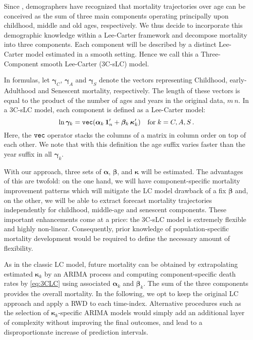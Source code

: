 \documentclass[Thesis]{subfiles}
\begin{document}
Since \citet{thiele1871mathematical}, demographers have recognized that mortality trajectories over age can be conceived as the sum of three main components operating principally upon childhood, middle and old ages, respectively. We thus decide to incorporate this demographic knowledge within a Lee-Carter framework and decompose mortality into three components. Each component will be described by a distinct Lee-Carter model estimated in a smooth setting. Hence we call this a Three-Component smooth Lee-Carter (3C-sLC) model. 

In formulas, let $\bm{\gamma}_{C}$, $\bm{\gamma}_{A}$ and $\bm{\gamma}_{S}$ denote the vectors representing Childhood, early-Adulthood and Senescent mortality, respectively. The length of these vectors is equal to the product of the number of ages and years in the original data, $m\,n$. 
In a 3C-sLC model, each component is defined as a Lee-Carter model:
\begin{equation}\label{eq:3CLC}
\ln \bm{\gamma}_{k} = \verb"vec"(\bm{\alpha}_{k}\,\bm{1}'_{n} +
\bm{\beta}_{k}\,\bm{\kappa}_{k}') \quad \mbox{for} \;k=C,A,S \, .
\end{equation}
Here, the $\verb"vec"$ operator stacks the columns of a matrix in column order on top of each other. We note that with this definition the age suffix varies faster than the year suffix in all $\bm{\gamma}_{k}$.

With our approach, three sets of $\bm{\alpha}$, $\bm{\beta}$, and $\bm{\kappa}$ will be estimated. The advantages of this are twofold: on the one hand, 
we will have component-specific mortality improvement patterns which will mitigate the LC model drawback of a fix $\bm{\beta}$ and, on the other, we will be able to extract forecast mortality trajectories independently for childhood, middle-age and senescent components. These important enhancements come at a price: the 3C-sLC model is extremely flexible and highly non-linear. Consequently, prior knowledge of population-specific mortality development would be required to define the necessary amount of flexibility. 

As in the classic LC model, future mortality can be obtained by extrapolating estimated $\bm{\kappa}_{k}$ by an ARIMA process and computing component-specific death rates by \eqref{eq:3CLC} using associated $\bm{\alpha}_{k}$ and $\bm{\beta}_{k}$. The sum of the three components provides the overall mortality. In the following, we opt to keep the original LC approach and apply a RWD to each time-index. Alternative procedures such as the selection of $\bm{\kappa}_{k}$-specific ARIMA models would simply add an additional layer of complexity without improving the final outcomes, and lead to a disproportionate increase of prediction intervals. 
\end{document}
